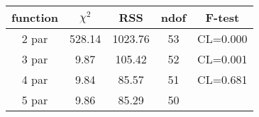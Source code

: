 \begin{tabular}{c|c|c|c|c}
function & $\chi^2$ & RSS & ndof & F-test \\
\hline
2 par & 528.14 & 1023.76 & 53 & CL=0.000 \\
3 par & 9.87 & 105.42 & 52 & CL=0.001 \\
4 par & 9.84 & 85.57 & 51 & CL=0.681 \\
5 par & 9.86 & 85.29 & 50 & \\
\hline
\end{tabular}